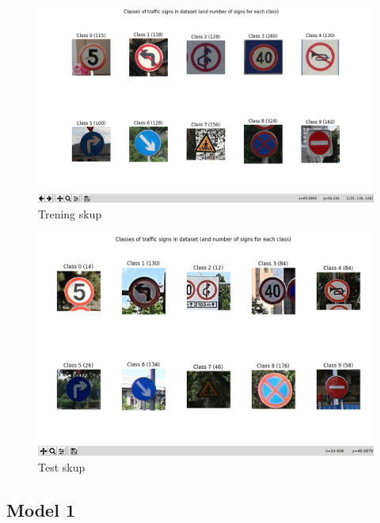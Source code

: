 \documentclass[a4paper]{article}
\begin{document}
\begin{figure}[h!]
\begin{center}
\includegraphics[scale=0.25]{trening_skup.png}
\end{center}
\caption{Trening skup}
\label{fig:trening_skup}
\end{figure}

\begin{figure}[h!]
\begin{center}
\includegraphics[scale=0.25]{test_skup.png}
\end{center}
\caption{Test skup}
\label{fig:test_skup}
\end{figure}


\subsection{Model 1}
\label{sec:model_1}
\end{document}
